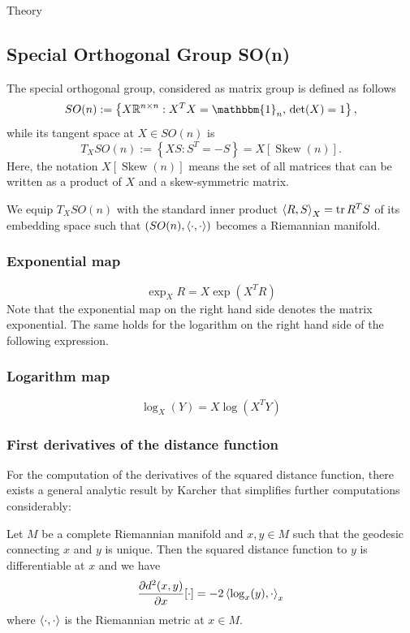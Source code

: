 \begin{chapter}{Theory}
\subsection{Special Orthogonal Group SO(n)} %
\label{sub:SO(N)}
The special orthogonal group, considered as matrix group is defined as follows
\begin{equation}
    SO(n):=\left\lbrace X\mathbb{R}^{n\times n}: X^TX=\mathbbm{1}_n,\,\det(X)=1\right\rbrace,
\end{equation}
while its tangent space at $X\in SO(n)$ is
\begin{equation}
    \label{eq:son_tangent_space}
    T_XSO(n):=\left\lbrace XS: S^T=-S \right\rbrace = X[\operatorname{Skew}(n)].
\end{equation}
Here, the notation $X[\operatorname{Skew}(n)]$ means the set of all matrices that can be written
as a product of $X$ and a skew-symmetric matrix.

We equip $T_XSO(n)$ with the standard inner product $\left\langle R,S \right\rangle_X=\operatorname{tr} R^TS$ of its embedding space such that
$(SO(n),\left\langle \cdot,\cdot \right\rangle)$ becomes a Riemannian manifold.

\subsubsection{Exponential map} %
\label{ssub:ExponentialSO}
\begin{equation}
    \exp_X{R}=X\exp(X^TR)
\end{equation}
Note that the exponential map on the right hand side denotes the matrix exponential. The same holds for the logarithm on the right hand side of the following expression.

\subsubsection{Logarithm map} %
\label{ssub:LogarithmSO}
\begin{equation}
    \label{eq:son_log}
    \log_X(Y)=X\log(X^TY)
\end{equation}


\subsubsection{First derivatives of the distance function} %
\label{ssub:FirstDerSO}
For the computation of the derivatives of the squared distance function, there exists a general analytic result by Karcher\cite{Karcher} that simplifies further
computations considerably:
\begin{theorem}[Karcher]
\label{thm:karcher_theorem}
Let $M$ be a complete Riemannian manifold and $x,y\in M$ such that the geodesic connecting $x$ and $y$ is unique. Then the squared distance function to $y$
is differentiable at $x$ and we have
\begin{equation}
    \frac{\partial d^2(x,y)}{\partial x}[\cdot] = -2\left\langle \log_x(y),\cdot \right\rangle_{x}
\end{equation}
where $\left\langle \cdot,\cdot \right\rangle$ is the Riemannian metric at $x\in M$.
\end{theorem}


\end{chapter}
